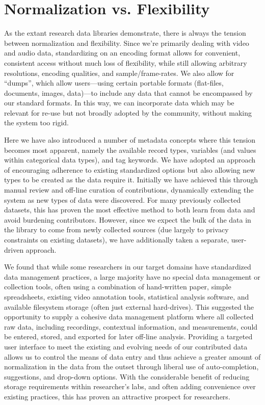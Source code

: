 \documentclass{sig-alternate}
\begin{document}
\section{Normalization vs. Flexibility}

As the extant research data libraries demonstrate, there is always the tension between normalization and flexibility.
Since we're primarily dealing with video and audio data, standardizing on an encoding format allows for convenient, consistent access without much loss of flexibility, while still allowing arbitrary resolutions, encoding qualities, and sample/frame-rates.
We also allow for ``dumps'', which allow users---using certain portable formats (flat-files, documents, images, data)---to include any data that cannot be encompassed by our standard formats.
In this way, we can incorporate data which may be relevant for re-use but not broadly adopted by the community, without making the system too rigid.

Here we have also introduced a number of metadata concepts where this tension becomes most apparent, namely the available record types, variables (and values within categorical data types), and tag keywords.
We have adopted an approach of encouraging adherence to existing standardized options but also allowing new types to be created as the data require it.
Initially we have achieved this through manual review and off-line curation of contributions, dynamically extending the system as new types of data were discovered.
For many previously collected datasets, this has proven the most effective method to both learn from data and avoid burdening contributors.
However, since we expect the bulk of the data in the library to come from newly collected sources (due largely to privacy constraints on existing datasets), we have additionally taken a separate, user-driven approach.

We found that while some researchers in our target domains have standardized data management practices, a large majority have no special data management or collection tools, often using a combination of hand-written paper, simple spreadsheets, existing video annotation tools, statistical analysis software, and available filesystem storage (often just external hard-drives).
This suggested the opportunity to supply a cohesive data management platform where all collected raw data, including recordings, contextual information, and measurements, could be entered, stored, and exported for later off-line analysis.
Providing a targeted user interface to meet the existing and evolving needs of our contributed data allows us to control the means of data entry and thus achieve a greater amount of normalization in the data from the outset through liberal use of auto-completion, suggestions, and drop-down options.
With the considerable benefit of reducing storage requirements within researcher's labs, and often adding convenience over existing practices, this has proven an attractive prospect for researchers.
\end{document}
